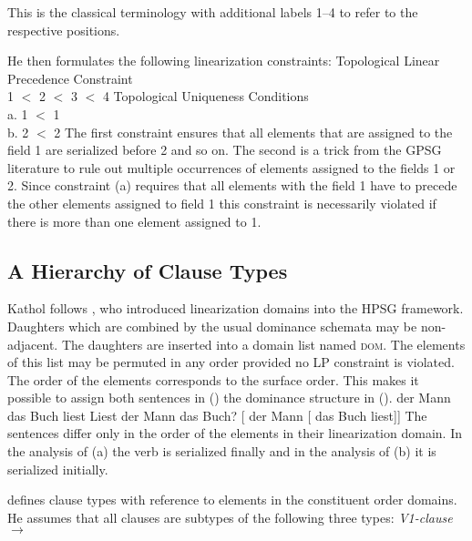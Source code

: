 \noindent
This is the classical terminology with additional labels 1--4 to refer to the respective
positions.

He then formulates the following linearization constraints:
\ea
Topological Linear Precedence Constraint\\
1 $<$ 2 $<$ 3 $<$ 4
\z
\ea
Topological Uniqueness Conditions\\
a. 1 $<$ 1\\
b. 2 $<$ 2
\z
The first constraint ensures that all elements that are assigned to the field
1 are serialized before 2 and so on. The second is a trick from the GPSG literature
\citep*[p.\,55]{GKPS85a} to rule out multiple occurrences of elements assigned to the
fields 1 or 2. Since constraint (a) requires that all elements with 
the field 1 have to precede the other elements assigned to field 1 
this constraint is necessarily violated if there is more than one element assigned to 1.

\subsection{A Hierarchy of Clause Types}

Kathol follows \citet{Reape90a,Reape92a,Reape94a}, who introduced linearization
domains into the HPSG framework. Daughters which are combined by the usual dominance
schemata may be non-adjacent. The daughters are inserted into a domain list named \textsc{dom}.
The elements of this list may be permuted in any order provided no LP constraint is violated.
The order of the elements corresponds to the surface order. This makes it possible to
assign both sentences in () the dominance structure in ().
\eal
\ex der Mann das Buch liest
\ex Liest der Mann das Buch?
\zl
\ea
{}[ der Mann [ das Buch liest]]
\z
The sentences differ only in the order of the elements in their linearization domain. In
the analysis of (a) the verb is serialized finally and in the analysis of (b)
it is serialized initially.

\citet{Kathol2001a} defines clause types with reference to elements in the constituent
order domains. He assumes that all clauses are subtypes of the following three
types:
\eal
\label{clause-types}
\ex\label{v1-clause-type} {\it V1-clause\/} $\to$ 

